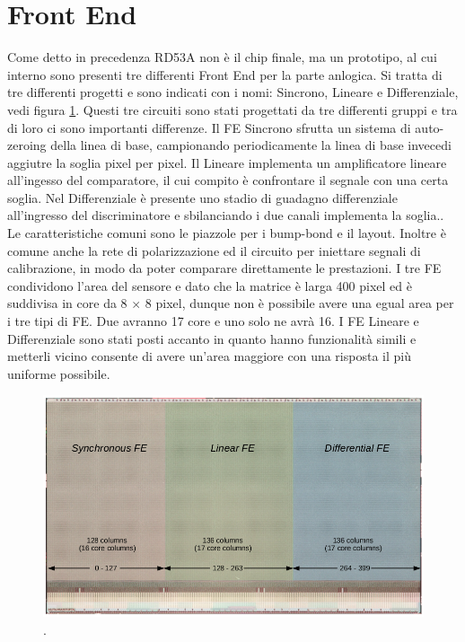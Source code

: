 \section{Front End}
Come detto in precedenza RD53A non è il chip finale, ma un prototipo, al cui interno sono presenti tre differenti Front End per la parte anlogica. Si tratta di tre differenti progetti e sono indicati con i nomi: Sincrono, Lineare e Differenziale, vedi figura \ref{FrontEnd}. 
Questi tre circuiti sono stati progettati da tre differenti gruppi e tra di loro ci sono importanti differenze. Il FE Sincrono sfrutta un sistema di auto-zeroing della linea di base, campionando periodicamente la linea di base invecedi aggiutre la soglia pixel per pixel. 
Il Lineare implementa un amplificatore lineare all'ingesso del comparatore, il cui compito è confrontare il segnale con una certa soglia. 
Nel Differenziale è presente uno stadio di guadagno differenziale  all'ingresso del discriminatore e sbilanciando i due canali implementa la soglia..
Le caratteristiche comuni sono le piazzole per i bump-bond e il layout. Inoltre è comune anche la rete di polarizzazione ed il circuito per iniettare segnali di calibrazione, in modo da poter comparare direttamente le prestazioni. 
I tre FE condividono l'area del sensore e dato che la matrice è larga 400 pixel ed è suddivisa in core da 8 $\times$ 8 pixel, dunque non è possibile avere una egual area per i tre tipi di FE. Due avranno 17 core e uno solo ne avrà 16. I FE Lineare e Differenziale sono stati posti accanto in quanto hanno funzionalità simili e metterli vicino consente di avere un'area maggiore con una risposta il più uniforme possibile. 
\begin{figure}
\centering
\includegraphics[scale=.3]{Immagini/FrontEnd}
\caption{.}
\label{FrontEnd}
\end{figure}

